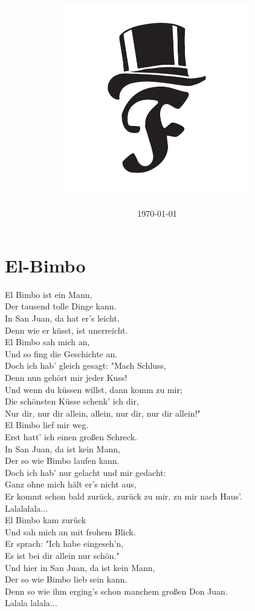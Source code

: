 \documentclass[twoside,8pt]{scrartcl}
\title{
	\fontfamily{ptm}{
		\fontsize{38}{40}
		\selectfont                %
		\color{color2}
		Liederbuch
	}
	\\ \includegraphics[scale=1.2]{bilder/Frackziskaner_Logo_einzeln.pdf}
}
\author{
	\fontfamily{bch}{
		\fontsize{20}{40}
		\selectfont                %
		\color{color2}
		Frackziskaner  
	}
}
\date{\today\\
	\fontfamily{bch}{
		\fontsize{8}{40}
		\selectfont                %
Auflage 1}}
\begin{document}
\maketitle
\cleardoublepage
\begingroup
\parskip=0pt
\tableofcontents
\endgroup
\clearpage

\section{El-Bimbo}
El Bimbo ist ein Mann,\\
Der tausend tolle Dinge kann.\\
In San Juan, da hat er's leicht,\\
Denn wie er küsst, ist unerreicht.\\
\newline
El Bimbo sah mich an,\\
Und so fing die Geschichte an.\\
Doch ich hab' gleich gesagt: "Mach Schluss,\\
Denn nun gehört mir jeder Kuss!\\
Und wenn du küssen willst, dann komm zu mir;\\
Die schönsten Küsse schenk' ich dir,\\
Nur dir, nur dir allein, allein, nur dir, nur dir allein!"\\
\newline
El Bimbo lief mir weg.\\
Erst hatt' ich einen großen Schreck.\\
In San Juan, da ist kein Mann,\\
Der so wie Bimbo laufen kann.\\
Doch ich hab' nur gelacht und mir gedacht:\\
Ganz ohne mich hält er's nicht aus,\\
Er kommt schon bald zurück, zurück zu mir, zu mir nach Haus'.\\
\newline
Lalalalala...\\
\newline
El Bimbo kam zurück\\
Und sah mich an mit frohem Blick.\\
Er sprach: "Ich habe eingeseh'n,\\
Es ist bei dir allein nur schön."\\
Und hier in San Juan, da ist kein Mann,\\
Der so wie Bimbo lieb sein kann.\\
Denn so wie ihm erging's schon manchem großen Don Juan.\\
\newline
Lalala lalala...
\end{document}
